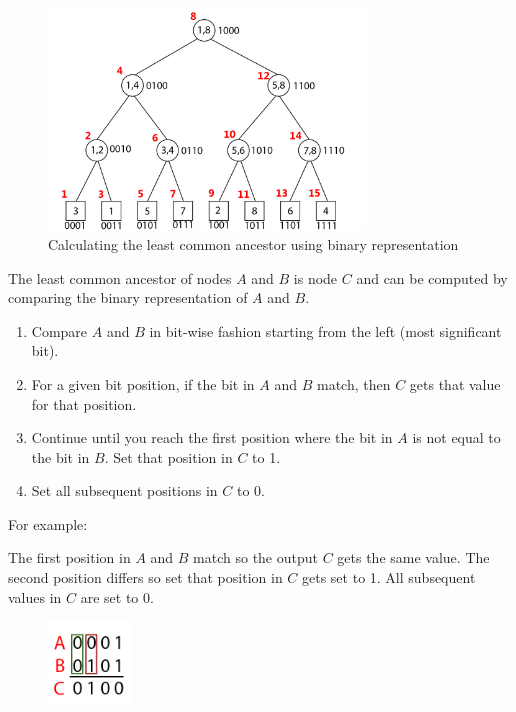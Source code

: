 \documentclass[twoside]{article}
\begin{document}
\begin{figure}[h]
\centering
\includegraphics[width=0.75\textwidth]{tree2.jpg}
\caption{Calculating the least common ancestor using binary representation}
\end{figure}

The least common ancestor of nodes $A$ and $B$ is node $C$ and can be computed by comparing the binary representation of $A$ and $B$.

\begin{enumerate}
\item Compare $A$ and $B$ in bit-wise fashion starting from the left (most significant bit).
\item For a given bit position, if the bit in $A$ and $B$ match, then $C$ gets that value for that position.
\item Continue until you reach the first position where the bit in $A$ is not equal to the bit in $B$.  Set that position in $C$ to 1.
\item Set all subsequent positions in $C$ to 0.
\end{enumerate}

For example:

The first position in $A$ and $B$ match so the output $C$ gets the same value.  The second position differs so set that position in $C$ gets set to 1.  All subsequent values in $C$ are set to 0.

\begin{figure}[h]
  \begin{center}
    \includegraphics[width=0.2\textwidth]{bits.jpg}
  \end{center}
\end{figure}
\end{document}

